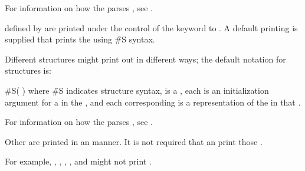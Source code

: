 % 
% 
% 

For information on how the  parses ,
see \secref\SharpsignP.


\endsubsubsection%
 defined by  are printed under the
control of the keyword  to .
A default printing  is supplied that prints the 
 using \f{\#S} syntax.

Different structures might print out in different ways;
the default notation for structures is:

\code
 #S( )
\endcode
where \f{\#S} indicates structure syntax,
 is a ,
each  is an initialization argument 
for a  in the ,
and each corresponding  is a representation
of the  in that .

For information on how the  parses ,
see \secref\SharpsignS.

\endsubsubsection%

Other  are printed in an  manner.
It is not required that an  print those 
.

For example, , 
	     ,
             ,
             ,
         and 
might not print .

